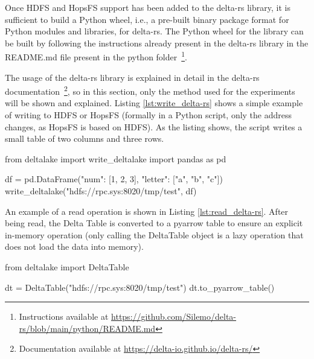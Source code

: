 Once \gls{HDFS} and \gls{HopsFS} support has been added to the delta-rs library, it is sufficient to build a Python wheel, i.e., a pre-built binary package format for Python modules and libraries, for delta-rs. The Python wheel for the library can be built by following the instructions already present in the delta-rs library in the README.md file present in the python folder~\footnote{Instructions available at \url{https://github.com/Silemo/delta-rs/blob/main/python/README.md}}.

The usage of the delta-rs library is explained in detail in the delta-rs documentation~\footnote{Documentation available at \url{https://delta-io.github.io/delta-rs/}}, so in this section, only the method used for the experiments will be shown and explained. Listing \ref{lst:write_delta-rs} shows a simple example of writing to \gls{HDFS} or \gls{HopsFS} (formally in a Python script, only the address changes, as \gls{HopsFS} is based on \gls{HDFS}). As the listing shows, the script writes a small table of two columns and three rows.
\begin{minipage}{\textwidth}
\begin{python}[caption={[Writing with delta-rs]Writing a DataFrame on a Delta Table with delta-rs on \gls{HDFS} or \gls{HopsFS}.}, label={lst:write_delta-rs}]
from deltalake import write_deltalake
import pandas as pd

df = pd.DataFrame({"num": [1, 2, 3], 
                   "letter": ["a", "b", "c"]})
write_deltalake("hdfs://rpc.sys:8020/tmp/test", df)
\end{python}
\end{minipage}
\medskip

An example of a read operation is shown in Listing \ref{lst:read_delta-rs}. After being read, the Delta Table is converted to a pyarrow table to ensure an explicit in-memory operation (only calling the DeltaTable object is a lazy operation that does not load the data into memory).
\begin{minipage}{\textwidth}
\begin{python}[caption={[Reading with delta-rs]Reading a DataFrame on a Delta Table with delta-rs on \gls{HDFS} or \gls{HopsFS}. Note: without the last line, the Delta Table is not loaded into memory, as delta-rs has a lazy evaluation approach.}, label={lst:read_delta-rs}]
from deltalake import DeltaTable

dt = DeltaTable("hdfs://rpc.sys:8020/tmp/test")
dt.to_pyarrow_table()
\end{python}
\end{minipage}